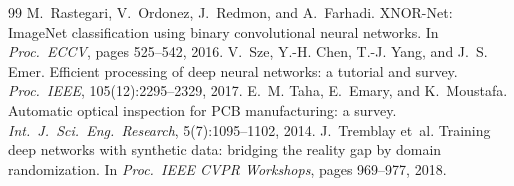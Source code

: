 \documentclass[10pt,twocolumn,a4paper]{article}
\begin{document}
\begin{thebibliography}{99}
 M.~Rastegari, V.~Ordonez, J.~Redmon, and A.~Farhadi. XNOR-Net: ImageNet classification using binary convolutional neural networks. In \emph{Proc.\ ECCV}, pages 525--542, 2016.
 V.~Sze, Y.-H. Chen, T.-J. Yang, and J.~S. Emer. Efficient processing of deep neural networks: a tutorial and survey. \emph{Proc.\ IEEE}, 105(12):2295--2329, 2017.
 E.~M. Taha, E.~Emary, and K.~Moustafa. Automatic optical inspection for PCB manufacturing: a survey. \emph{Int.\ J.\ Sci.\ Eng.\ Research}, 5(7):1095--1102, 2014.
 J.~Tremblay et~al. Training deep networks with synthetic data: bridging the reality gap by domain randomization. In \emph{Proc.\ IEEE CVPR Workshops}, pages 969--977, 2018.
\end{thebibliography}
\end{document}
